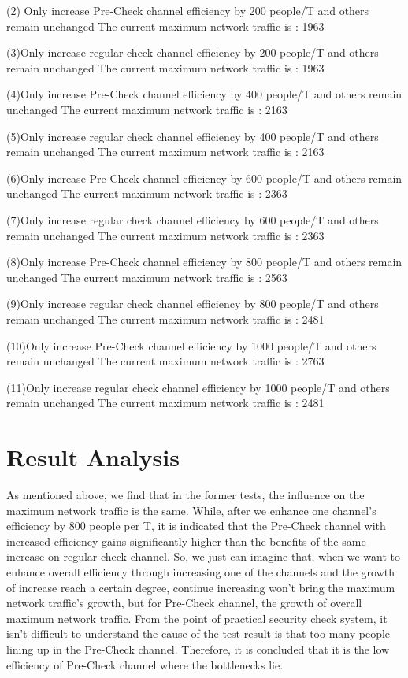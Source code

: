 \documentclass[12pt]{article}
\begin{document}
(2) Only increase Pre-Check channel efficiency by 200 people/T and others remain unchanged
The current maximum network traffic is : 1963

(3)Only increase regular check channel efficiency by 200 people/T and others remain unchanged
The current maximum network traffic is : 1963

(4)Only increase Pre-Check channel efficiency by 400 people/T and others remain unchanged
The current maximum network traffic is : 2163

(5)Only increase regular check channel efficiency by 400 people/T and others remain unchanged
The current maximum network traffic is : 2163

(6)Only increase Pre-Check channel efficiency by 600 people/T and others remain unchanged
The current maximum network traffic is : 2363

(7)Only increase regular check channel efficiency by 600 people/T and others remain unchanged
The current maximum network traffic is : 2363

(8)Only increase Pre-Check channel efficiency by 800 people/T and others remain unchanged
The current maximum network traffic is : 2563

(9)Only increase regular check channel efficiency by 800 people/T and others remain unchanged
The current maximum network traffic is : 2481

(10)Only increase Pre-Check channel efficiency by 1000 people/T and others remain unchanged
The current maximum network traffic is : 2763

(11)Only increase regular check channel efficiency by 1000 people/T and others remain unchanged
The current maximum network traffic is : 2481
\section{Result Analysis}

\setlength{\parindent}{2em}
As mentioned above, we find that in the former tests, the influence on the maximum network traffic is the same. While, after we enhance one channel's efficiency by 800 people per T, it is indicated that the Pre-Check channel with increased efficiency gains significantly higher than the benefits of the same increase on regular check channel.
So, we just can imagine that, when we want to enhance overall efficiency through increasing one of the channels and the growth of increase reach a certain degree, continue increasing won't bring the maximum network traffic's growth, but for Pre-Check channel, the growth of overall  maximum network traffic. From the point of practical security check system, it isn't difficult to understand the cause of the test result is that too many people lining up in the Pre-Check channel. Therefore, it is concluded that it is the low efficiency of Pre-Check channel where the bottlenecks lie.
\end{document}
